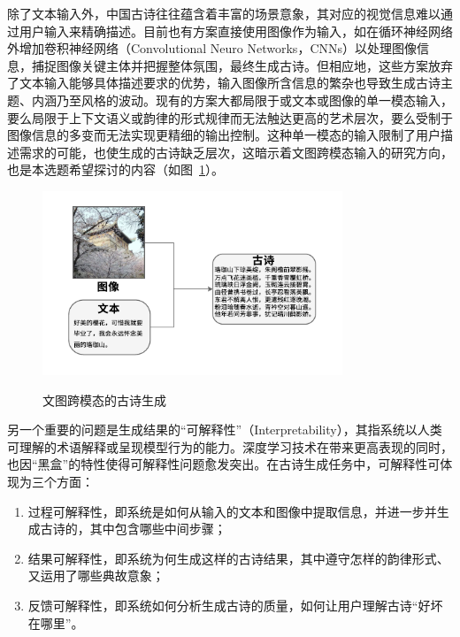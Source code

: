 除了文本输入外，中国古诗往往蕴含着丰富的场景意象，其对应的视觉信息难以通过用户输入来精确描述。目前也有方案直接使用图像作为输入，如在循环神经网络外增加卷积神经网络（Convolutional Neuro Networks，CNNs）以处理图像信息，捕捉图像关键主体并把握整体氛围，最终生成古诗。但相应地，这些方案放弃了文本输入能够具体描述要求的优势，输入图像所含信息的繁杂也导致生成古诗主题、内涵乃至风格的波动。现有的方案大都局限于或文本或图像的单一模态输入，要么局限于上下文语义或韵律的形式规律而无法触达更高的艺术层次，要么受制于图像信息的多变而无法实现更精细的输出控制。这种单一模态的输入限制了用户描述需求的可能，也使生成的古诗缺乏层次，这暗示着文图跨模态输入的研究方向，也是本选题希望探讨的内容（如图~\ref{fig:文图生成}）。

\begin{figure}[ht]
  \centering
  \includegraphics[width=0.8\textwidth]
  {figures/文图生成.pdf}\\
  \caption{文图跨模态的古诗生成}
  \label{fig:文图生成}

\end{figure}

另一个重要的问题是生成结果的“可解释性”（Interpretability），其指系统以人类可理解的术语解释或呈现模型行为的能力。深度学习技术在带来更高表现的同时，也因“黑盒”的特性使得可解释性问题愈发突出。在古诗生成任务中，可解释性可体现为三个方面：

\begin{enumerate}[label=（\arabic*）, itemindent=2em]   %
    \item 过程可解释性，即系统是如何从输入的文本和图像中提取信息，并进一步并生成古诗的，其中包含哪些中间步骤；
    \item 结果可解释性，即系统为何生成这样的古诗结果，其中遵守怎样的韵律形式、又运用了哪些典故意象；
    \item 反馈可解释性，即系统如何分析生成古诗的质量，如何让用户理解古诗“好坏在哪里”。
\end{enumerate}


